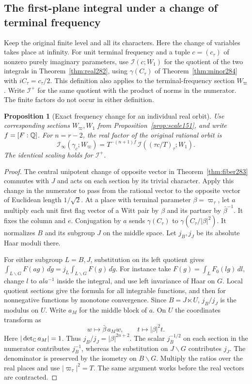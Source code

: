 \documentclass[a4paper,11pt]{article}
\newtheorem{proposition}{Proposition}[section]
\theoremstyle{definition}
\theoremstyle{remark}
\numberwithin{equation}{section}
\begin{document}
\subsection{The first-plane integral under a change of terminal frequency}\label{nav:VI-50}
Keep the original finite level and all its characters. Here
the change of variables takes place at infinity. For unit
terminal frequency and a tuple \(c=(c_\tau)\) of nonzero
purely imaginary parameters, use \(\mathcal I(c;W_1)\)
for the quotient of the two integrals in
Theorem~\ref{thm:real282}, using
\(\gamma(C_\tau)\) of Theorem~\ref{thm:minor284} with
\(iC_\tau=c_\tau/2\). This definition also applies to the
terminal-frequency section \(W_\varpi\). Write \(\mathcal I^+\)
for the same quotient with the product of norms in the
numerator. The finite factors do not occur in either definition.

\begin{proposition}[Exact frequency change for an individual real orbit]\leavevmode
\label{prop:scale284}
Use corresponding sections \(W_\varpi,W_1\) from
Proposition~\ref{prop:scale151}, and write \(f=[F:\mathbb Q]\).
For \(n=r-2\), the real factor of the original rational orbit is
\[
 \mathcal I_\infty(\gamma_c;W_\varpi)
       =T^{-(n+1)f}\,\mathcal I((\tau c/T)_\tau;W_1).
\]
The identical scaling holds for \(\mathcal I^+\).
\end{proposition}
\begin{proof}
The central unipotent change of opposite vector in
Theorem~\ref{thm:fiber283} commutes with \(J\) and acts on
each section by its trivial character. Apply this change in
the numerator to pass from the rational vector to the
opposite vector of Euclidean length \(1/\sqrt2\).
At a place with terminal parameter \(\beta=\varpi_\tau\),
let \(a\) multiply each unit first flag vector of a Witt
pair by \(\beta\) and its partner by \(\bar\beta^{-1}\).
It fixes the column and \(e\). Conjugation by \(a\) sends
\(\gamma(C_\tau)\) to \(\gamma(C_\tau/|\beta|^2)\).
It normalizes \(B\) and its subgroup \(J\) on the middle
space. Let \(j_B,j_J\) be its absolute Haar moduli there.

For either subgroup \(L=B,J\), substitution on its left
quotient gives
\(\int_{L\backslash G}F(ag)\,d\dot g
    =j_L\int_{L\backslash G}F(g)\,d\dot g\).
For instance take \(F(g)=\int_L F_0(lg)\,dl\), change
\(l\) to \(ala^{-1}\) inside the integral, and use left
invariance of Haar on \(G\). Local quotient sections give
the formula for all integrable functions, and then for
nonnegative functions by monotone convergence.
Since \(B=J\ltimes U\), \(j_B/j_J\) is the modulus on \(U\).
Write \(a_M\) for the middle block of \(a\). On \(U\) the
coordinates transform as
\[
         w\longmapsto\bar\beta\,a_M w,\qquad
         t\longmapsto |\beta|^2t .
\]
Here \(|\det_{\mathbb C}a_M|=1\). Thus \(j_B/j_J=|\beta|^{2n+2}\).
The scalar \(j_B^{-1/2}\) on each section in the numerator
contributes \(j_B^{-1}\), whereas the substitution on
\(J\backslash G\) contributes \(j_J\).
The denominator is preserved by the isometry on
\(B\backslash G\). Multiply the ratios over the real places
and use \(|\varpi_\tau|^2=T\). The same argument works before
the real vectors are contracted.
\end{proof}
\end{document}
